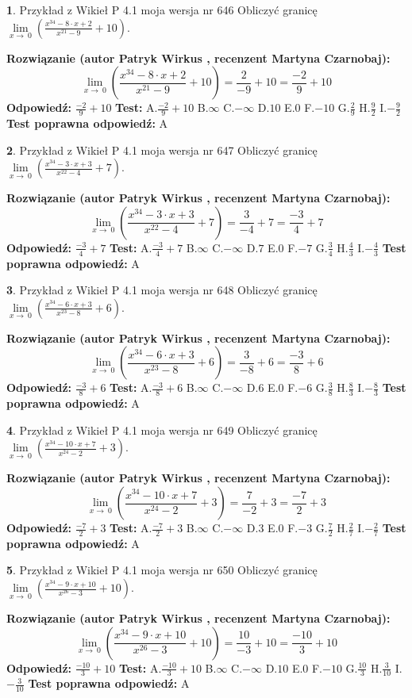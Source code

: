 \documentclass[12pt, a4paper]{article}
\theoremstyle{definition} %
\newtheorem{zad}{}
\newcommand{\zadStart}[1]{\begin{zad}#1\newline}
\newcommand{\zadStop}{\end{zad}}
\newcommand{\rozwStart}[2]{\noindent \textbf{Rozwiązanie (autor #1 , recenzent #2): }\newline}
\newcommand{\rozwStop}{\newline}
\newcommand{\odpStart}{\noindent \textbf{Odpowiedź:}\newline}
\newcommand{\odpStop}{\newline}
\newcommand{\testStart}{\noindent \textbf{Test:}\newline}
\newcommand{\testStop}{\newline}
\newcommand{\kluczStart}{\noindent \textbf{Test poprawna odpowiedź:}\newline}
\newcommand{\kluczStop}{\newline}
\begin{document}
\zadStart{Przykład z Wikieł P 4.1 moja wersja nr 646}
Obliczyć granicę $\lim\limits_{x\to\ 0}(\frac{x^{34}-8 \cdot x +2}{x^{21}-9}+10)$.
\zadStop
\rozwStart{Patryk Wirkus}{Martyna Czarnobaj}
$$\lim\limits_{x\to\ 0}(\frac{x^{34}-8 \cdot x +2}{x^{21}-9}+10)=\frac{2}{-9}+10=\frac{-2}{9}+10$$
\rozwStop
\odpStart
$\frac{-2}{9}+10$
\odpStop
\testStart
A.$\frac{-2}{9}+10$
B.$\infty$
C.$-\infty$
D.$10$
E.$0$
F.$-10$
G.$\frac{2}{9}$
H.$\frac{9}{2}$
I.$-\frac{9}{2}$
\testStop
\kluczStart
A
\kluczStop



\zadStart{Przykład z Wikieł P 4.1 moja wersja nr 647}
Obliczyć granicę $\lim\limits_{x\to\ 0}(\frac{x^{34}-3 \cdot x +3}{x^{22}-4}+7)$.
\zadStop
\rozwStart{Patryk Wirkus}{Martyna Czarnobaj}
$$\lim\limits_{x\to\ 0}(\frac{x^{34}-3 \cdot x +3}{x^{22}-4}+7)=\frac{3}{-4}+7=\frac{-3}{4}+7$$
\rozwStop
\odpStart
$\frac{-3}{4}+7$
\odpStop
\testStart
A.$\frac{-3}{4}+7$
B.$\infty$
C.$-\infty$
D.$7$
E.$0$
F.$-7$
G.$\frac{3}{4}$
H.$\frac{4}{3}$
I.$-\frac{4}{3}$
\testStop
\kluczStart
A
\kluczStop



\zadStart{Przykład z Wikieł P 4.1 moja wersja nr 648}
Obliczyć granicę $\lim\limits_{x\to\ 0}(\frac{x^{34}-6 \cdot x +3}{x^{23}-8}+6)$.
\zadStop
\rozwStart{Patryk Wirkus}{Martyna Czarnobaj}
$$\lim\limits_{x\to\ 0}(\frac{x^{34}-6 \cdot x +3}{x^{23}-8}+6)=\frac{3}{-8}+6=\frac{-3}{8}+6$$
\rozwStop
\odpStart
$\frac{-3}{8}+6$
\odpStop
\testStart
A.$\frac{-3}{8}+6$
B.$\infty$
C.$-\infty$
D.$6$
E.$0$
F.$-6$
G.$\frac{3}{8}$
H.$\frac{8}{3}$
I.$-\frac{8}{3}$
\testStop
\kluczStart
A
\kluczStop



\zadStart{Przykład z Wikieł P 4.1 moja wersja nr 649}
Obliczyć granicę $\lim\limits_{x\to\ 0}(\frac{x^{34}-10 \cdot x +7}{x^{24}-2}+3)$.
\zadStop
\rozwStart{Patryk Wirkus}{Martyna Czarnobaj}
$$\lim\limits_{x\to\ 0}(\frac{x^{34}-10 \cdot x +7}{x^{24}-2}+3)=\frac{7}{-2}+3=\frac{-7}{2}+3$$
\rozwStop
\odpStart
$\frac{-7}{2}+3$
\odpStop
\testStart
A.$\frac{-7}{2}+3$
B.$\infty$
C.$-\infty$
D.$3$
E.$0$
F.$-3$
G.$\frac{7}{2}$
H.$\frac{2}{7}$
I.$-\frac{2}{7}$
\testStop
\kluczStart
A
\kluczStop



\zadStart{Przykład z Wikieł P 4.1 moja wersja nr 650}
Obliczyć granicę $\lim\limits_{x\to\ 0}(\frac{x^{34}-9 \cdot x +10}{x^{26}-3}+10)$.
\zadStop
\rozwStart{Patryk Wirkus}{Martyna Czarnobaj}
$$\lim\limits_{x\to\ 0}(\frac{x^{34}-9 \cdot x +10}{x^{26}-3}+10)=\frac{10}{-3}+10=\frac{-10}{3}+10$$
\rozwStop
\odpStart
$\frac{-10}{3}+10$
\odpStop
\testStart
A.$\frac{-10}{3}+10$
B.$\infty$
C.$-\infty$
D.$10$
E.$0$
F.$-10$
G.$\frac{10}{3}$
H.$\frac{3}{10}$
I.$-\frac{3}{10}$
\testStop
\kluczStart
A
\kluczStop
\end{document}
